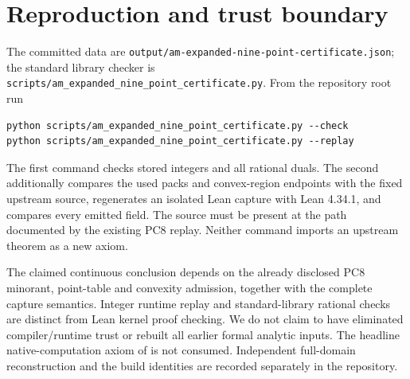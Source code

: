 \documentclass[11pt,a4paper]{article}
\begin{document}
\section{Reproduction and trust boundary}

The committed data are
\texttt{output/am-expanded-nine-point-certificate.json}; the standard
library checker is \texttt{scripts/am\_expanded\_nine\_point\_certificate.py}.
From the repository root run
\begin{verbatim}
python scripts/am_expanded_nine_point_certificate.py --check
python scripts/am_expanded_nine_point_certificate.py --replay
\end{verbatim}
The first command checks stored integers and all rational duals.
The second additionally compares the used packs and convex-region
endpoints with the fixed upstream source, regenerates an isolated Lean
capture with Lean 4.34.1, and compares every emitted field. The source
must be present at the path documented by the existing PC8 replay.
Neither command imports an upstream theorem as a new axiom.

The claimed continuous conclusion depends on the already disclosed
PC8 minorant, point-table and convexity admission, together with the
complete capture semantics. Integer runtime replay and standard-library
rational checks are distinct from Lean kernel proof checking. We do not
claim to have eliminated compiler/runtime trust or rebuilt all earlier
formal analytic inputs. The headline native-computation axiom of
\cite{Knaus} is not consumed. Independent full-domain reconstruction
and the build identities are recorded separately in the repository.
\end{document}
